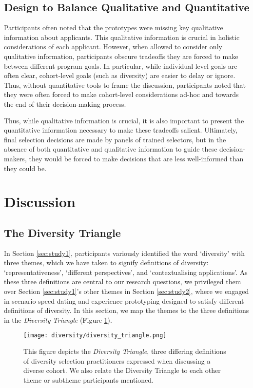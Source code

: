 \subsection{Design to Balance Qualitative and Quantitative}
Participants often noted that the prototypes were missing key qualitative information about applicants. This qualitative information is crucial in holistic considerations of each applicant. However, when allowed to consider only qualitative information, participants obscure tradeoffs they are forced to make between different program goals. In particular, while individual-level goals are often clear, cohort-level goals (such as diversity) are easier to delay or ignore. Thus, without quantitative tools to frame the discussion, participants noted that they were often forced to make cohort-level considerations ad-hoc and towards the end of their decision-making process.

Thus, while qualitative information is crucial, it is also important to present the quantitative information necessary to make these tradeoffs salient. Ultimately, final selection decisions are made by panels of trained selectors, but in the absence of both quantitative and qualitative information to guide these decision-makers, they would be forced to make decisions that are less well-informed than they could be.

\section{Discussion}\label{sec:divdisc}
\subsection{The Diversity Triangle}
In Section \ref{sec:study1}, participants variously identified the word `diversity' with three themes, which we have taken to signify definitions of diversity: `representativeness', `different perspectives', and `contextualising applications'. As these three definitions are central to our research questions, we privileged them over Section \ref{sec:study1}'s other themes in Section \ref{sec:study2}, where we engaged in scenario speed dating and experience prototyping designed to satisfy different definitions of diversity. In this section, we map the themes to the three definitions in the \emph{Diversity Triangle} (Figure \ref{fig:div_triangle}).

\begin{figure}[htbp]
    \centering
    \texttt{[image: diversity/diversity\_triangle.png]}
    \caption{This figure depicts the \emph{Diversity Triangle}, three differing definitions of diversity selection practitioners expressed when discussing a diverse cohort. We also relate the Diversity Triangle to each other theme or subtheme participants mentioned.}
    \label{fig:div_triangle}
\end{figure}

